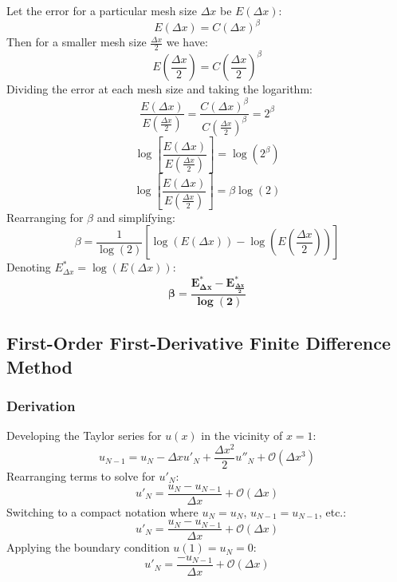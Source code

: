 \documentclass[10pt, reqno]{article}		%
\numberwithin{equation}{section}
\begin{document}
Let the error for a particular mesh size $\Delta x$ be $E\left(\Delta x\right)$:
\begin{equation}
E\left(\Delta x\right) = C\left(\Delta x\right)^\beta
\end{equation}
Then for a smaller mesh size $\frac{\Delta x}{2}$ we have:
\begin{equation}
E\left(\frac{\Delta x}{2}\right) = C\left(\frac{\Delta x}{2}\right)^\beta
\end{equation}
Dividing the error at each mesh size and taking the logarithm:
\begin{equation}
\frac{E\left(\Delta x\right)}{E\left(\frac{\Delta x}{2}\right)} = \frac{C\left(\Delta x\right)^\beta}{C\left(\frac{\Delta x}{2}\right)^\beta} = 2^\beta
\end{equation}
\begin{equation}
\log\left[\frac{E\left(\Delta x\right)}{E\left(\frac{\Delta x}{2}\right)}\right] = \log(2^\beta)
\end{equation}
\begin{equation}
\log\left[\frac{E\left(\Delta x\right)}{E\left(\frac{\Delta x}{2}\right)}\right] = \beta \log(2)
\end{equation}
Rearranging for $\beta$ and simplifying:
\begin{equation}
\beta = \frac{1}{\log(2)} \left[\log\left(E\left(\Delta x\right)\right) - \log\left(E\left(\frac{\Delta x}{2}\right)\right)\right] 
\end{equation}
Denoting $E^*_{\Delta x} = \log\left(E\left(\Delta x\right)\right)$:
\begin{equation}
\mathbf{\beta = \frac{E^*_{\Delta x} - E^*_{\frac{\Delta x}{2}}}{\log (2)}}
\end{equation}

\subsection{First-Order First-Derivative Finite Difference Method}

\subsubsection{Derivation}

Developing the Taylor series for $u(x)$ in the vicinity of $x = 1$:
\begin{equation}
u_{N-1} = u_N - \Delta x u'_N + \frac{\Delta x^2}{2} u''_N + \mathcal{O}(\Delta x^3)
\end{equation}
Rearranging terms to solve for $u'_N$:
\begin{equation}
u'_N = \frac{u_N - u_{N-1}}{\Delta x} + \mathcal{O}(\Delta x)
\end{equation}
Switching to a compact notation where $u_N = u_N$, $u_{N-1} = u_{N-1}$, etc.:
\begin{equation}
u'_N = \frac{u_N - u_{N-1}}{\Delta x} + \mathcal{O}(\Delta x)
\end{equation}
Applying the boundary condition $u(1) = u_N = 0$:
\begin{equation}
u'_N = \frac{- u_{N-1}}{\Delta x} + \mathcal{O}(\Delta x)
\end{equation}
\end{document}
